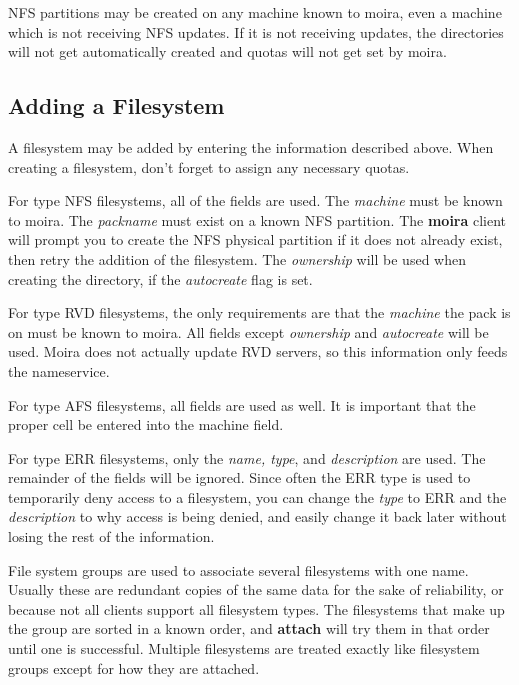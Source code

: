 \documentclass{book}
\begin{document}
NFS partitions may be created on any machine known to moira, even a
machine which is not receiving NFS updates.  If it is not receiving
updates, the directories will not get automatically created and quotas
will not get set by moira.

\subsection{Adding a Filesystem}

A filesystem may be added by entering the information described above.
When creating a filesystem, don't forget to assign any necessary quotas.

For type NFS filesystems, all of the fields are used.  The {\em machine}
must be known to moira.  The {\em packname} must exist on a known NFS
partition.  The {\bf moira} client will prompt you to create the NFS
physical partition if it does not already exist, then retry the
addition of the filesystem.  The {\em ownership} will be used when
creating the directory, if the {\em autocreate} flag is set.

For type RVD filesystems, the only requirements are that the {\em machine}
the pack is on must be known to moira.  All fields except {\em ownership}
and {\em autocreate} will be used.  Moira does not actually update RVD
servers, so this information only feeds the nameservice.

For type AFS filesystems, all fields are used as well.  It is
important that the proper cell be entered into the machine field.

For type ERR filesystems, only the {\em name, type}, and {\em description} are
used.  The remainder of the fields will be ignored.  Since often the ERR
type is used to temporarily deny access to a filesystem, you can
change the {\em type} to ERR and the {\em description} to why access is being
denied, and easily change it back later without losing the rest of the
information. 

File system groups are used to associate several filesystems with one
name.  Usually these are redundant copies of the same data for the
sake of reliability, or because not all clients support all filesystem
types.  The filesystems that make up the group are sorted in a known
order, and {\bf attach} will try them in that order until one is
successful.  Multiple filesystems are treated exactly like filesystem
groups except for how they are attached.
\end{document}
